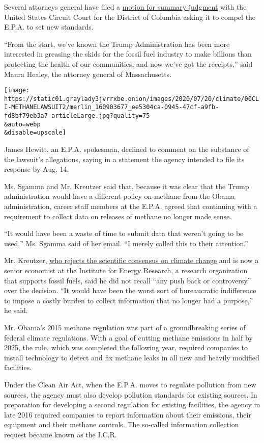 Several attorneys general have filed a
\href{https://www.mass.gov/doc/methane-summary-judgment/download}{motion
for summary judgment} with the United States Circuit Court for the
District of Columbia asking it to compel the E.P.A. to set new
standards.

``From the start, we've known the Trump Administration has been more
interested in greasing the skids for the fossil fuel industry to make
billions than protecting the health of our communities, and now we've
got the receipts,'' said Maura Healey, the attorney general of
Massachusetts.

\texttt{[image: https://static01.graylady3jvrrxbe.onion/images/2020/07/20/climate/00CLI-METHANELAWSUIT2/merlin\_160903677\_ee5304ca-0945-47cf-a9fb-fd8bf79eb3a7-articleLarge.jpg?quality=75\\\&auto=webp\\\&disable=upscale]}

James Hewitt, an E.P.A. spokesman, declined to comment on the substance
of the lawsuit's allegations, saying in a statement the agency intended
to file its response by Aug. 14.

Ms. Sgamma and Mr. Kreutzer said that, because it was clear that the
Trump administration would have a different policy on methane from the
Obama administration, career staff members at the E.P.A. agreed that
continuing with a requirement to collect data on releases of methane no
longer made sense.

``It would have been a waste of time to submit data that weren't going
to be used,'' Ms. Sgamma said of her email. ``I merely called this to
their attention.''

Mr. Kreutzer,
\href{https://www.heritage.org/environment/report/the-state-climate-science-no-justification-extreme-policies}{who
rejects the scientific consensus on climate change} and is now a senior
economist at the Institute for Energy Research, a research organization
that supports fossil fuels, said he did not recall ``any push back or
controversy'' over the decision. ``It would have been the worst sort of
bureaucratic indifference to impose a costly burden to collect
information that no longer had a purpose,'' he said.

Mr. Obama's 2015 methane regulation was part of a groundbreaking series
of federal climate regulations. With a goal of cutting methane emissions
in half by 2025, the rule, which was completed the following year,
required companies to install technology to detect and fix methane leaks
in all new and heavily modified facilities.

Under the Clean Air Act, when the E.P.A. moves to regulate pollution
from new sources, the agency must also develop pollution standards for
existing sources. In preparation for developing a second regulation for
existing facilities, the agency in late 2016 required companies to
report information about their emissions, their equipment and their
methane controls. The so-called information collection request became
known as the I.C.R.

